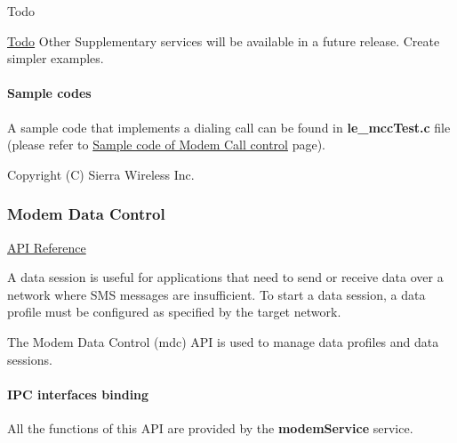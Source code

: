 \begin{DoxyRefDesc}{Todo}
\item[\hyperlink{todo__todo000063}{Todo}]Other Supplementary services will be available in a future release. Create simpler examples.\end{DoxyRefDesc}
\hypertarget{c_mcc_le_mcc_samples}{}\paragraph{Sample codes}\label{c_mcc_le_mcc_samples}
A sample code that implements a dialing call can be found in {\bfseries le\+\_\+mcc\+Test.\+c} file (please refer to \hyperlink{c_mccTest}{Sample code of Modem Call control} page).





Copyright (C) Sierra Wireless Inc. \hypertarget{c_mdc}{}\subsubsection{Modem Data Control}\label{c_mdc}
\hyperlink{le__mdc__interface_8h}{A\+PI Reference}





A data session is useful for applications that need to send or receive data over a network where S\+MS messages are insufficient. To start a data session, a data profile must be configured as specified by the target network.

The Modem Data Control (mdc) A\+PI is used to manage data profiles and data sessions.\hypertarget{c_mdc_le_mdc_binding}{}\paragraph{I\+P\+C interfaces binding}\label{c_mdc_le_mdc_binding}
All the functions of this A\+PI are provided by the {\bfseries modem\+Service} service.

